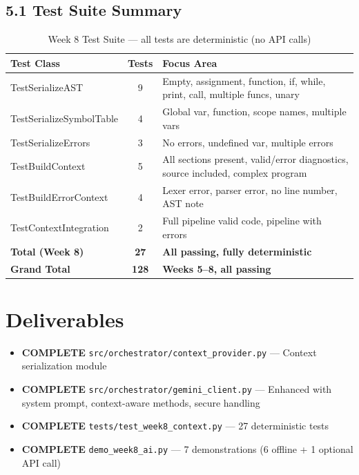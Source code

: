 \documentclass[a4paper,11pt]{article}
\newcommand{\statusgood}[1]{\colorbox{green!20}{\textbf{#1}}}
\begin{document}
    \subsection{5.1 Test Suite Summary}

    \begin{table}[h]
    \centering
    \begin{tabularx}{\textwidth}{|l|c|X|}
    \hline
    \rowcolor{blue!10}
    \textbf{Test Class} & \textbf{Tests} & \textbf{Focus Area} \\
    \hline
    TestSerializeAST & 9 & Empty, assignment, function, if, while, print, call, multiple funcs, unary \\
    \hline
    TestSerializeSymbolTable & 4 & Global var, function, scope names, multiple vars \\
    \hline
    TestSerializeErrors & 3 & No errors, undefined var, multiple errors \\
    \hline
    TestBuildContext & 5 & All sections present, valid/error diagnostics, source included, complex program \\
    \hline
    TestBuildErrorContext & 4 & Lexer error, parser error, no line number, AST note \\
    \hline
    TestContextIntegration & 2 & Full pipeline valid code, pipeline with errors \\
    \hline
    \textbf{Total (Week 8)} & \textbf{27} & \textbf{All passing, fully deterministic} \\
    \hline
    \textbf{Grand Total} & \textbf{128} & \textbf{Weeks 5--8, all passing} \\
    \hline
    \end{tabularx}
    \caption{Week 8 Test Suite --- all tests are deterministic (no API calls)}
    \end{table}

    \section{Deliverables}

    \begin{itemize}[leftmargin=*]
        \item \statusgood{COMPLETE} \texttt{src/orchestrator/context\_provider.py} --- Context serialization module
        \item \statusgood{COMPLETE} \texttt{src/orchestrator/gemini\_client.py} --- Enhanced with system prompt, context-aware methods, secure handling
        \item \statusgood{COMPLETE} \texttt{tests/test\_week8\_context.py} --- 27 deterministic tests
        \item \statusgood{COMPLETE} \texttt{demo\_week8\_ai.py} --- 7 demonstrations (6 offline + 1 optional API call)
    \end{itemize}
\end{document}
